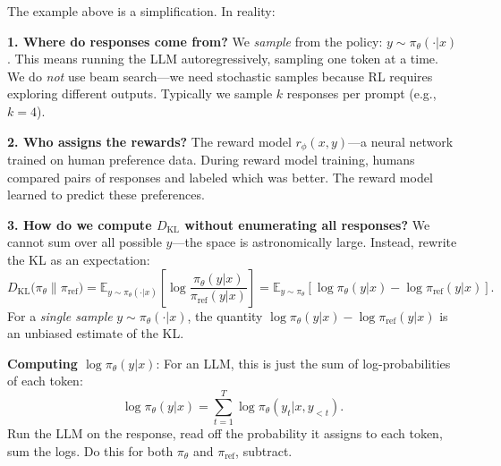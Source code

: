 \begin{remark}
    The example above is a simplification. In reality:

    \textbf{1. Where do responses come from?}
    We \emph{sample} from the policy: $y \sim \pi_\theta(\cdot|x)$. This means running the LLM autoregressively, sampling one token at a time. We do \emph{not} use beam search---we need stochastic samples because RL requires exploring different outputs. Typically we sample $k$ responses per prompt (e.g., $k=4$).

    \textbf{2. Who assigns the rewards?}
    The reward model $r_\phi(x, y)$---a neural network trained on human preference data. During reward model training, humans compared pairs of responses and labeled which was better. The reward model learned to predict these preferences.

    \textbf{3. How do we compute $D_{\mathrm{KL}}$ without enumerating all responses?}
    We cannot sum over all possible $y$---the space is astronomically large. Instead, rewrite the KL as an expectation:
    \[
        D_{\mathrm{KL}}\bigl(\pi_\theta \| \pi_{\text{ref}}\bigr) = \mathbb{E}_{y \sim \pi_\theta(\cdot|x)} \left[ \log \frac{\pi_\theta(y|x)}{\pi_{\text{ref}}(y|x)} \right] = \mathbb{E}_{y \sim \pi_\theta} \left[ \log \pi_\theta(y|x) - \log \pi_{\text{ref}}(y|x) \right].
    \]
    For a \emph{single sample} $y \sim \pi_\theta(\cdot|x)$, the quantity $\log \pi_\theta(y|x) - \log \pi_{\text{ref}}(y|x)$ is an unbiased estimate of the KL.

    \textbf{Computing $\log \pi_\theta(y|x)$}: For an LLM, this is just the sum of log-probabilities of each token:
    \[
        \log \pi_\theta(y|x) = \sum_{t=1}^{T} \log \pi_\theta(y_t | x, y_{<t}).
    \]
    Run the LLM on the response, read off the probability it assigns to each token, sum the logs. Do this for both $\pi_\theta$ and $\pi_{\text{ref}}$, subtract.
\end{remark}

